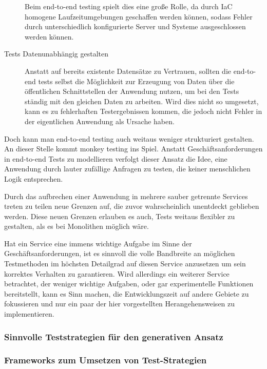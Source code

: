 \documentclass[12pt,a4paper,bibliography=totocnumbered,listof=totocnumbered]{scrartcl}
\begin{document}
\begin{description}
	Beim end-to-end testing spielt dies eine große Rolle, da durch \ac{IaC} homogene Laufzeitumgebungen geschaffen werden können, sodass Fehler durch unterschiedlich konfigurierte Server und Systeme ausgeschlossen werden können.\cite{clemson}
	
	\item[Tests Datenunabhängig gestalten] Anstatt auf bereits existente Datensätze zu Vertrauen, sollten die end-to-end tests selbst die Möglichkeit zur Erzeugung von Daten über die öffentlichen Schnittstellen der Anwendung nutzen, um bei den Tests ständig mit den gleichen Daten zu arbeiten. Wird dies nicht so umgesetzt, kann es zu fehlerhaften Testergebnissen kommen, die jedoch nicht Fehler in der eigentlichen Anwendung als Ursache haben.\cite{clemson}
\end{description}

Doch kann man end-to-end testing auch weitaus weniger strukturiert gestalten. An dieser Stelle kommt monkey testing ins Spiel. Anstatt Geschäftsanforderungen in end-to-end Tests zu modellieren verfolgt dieser Ansatz die Idee, eine Anwendung durch lauter zufällige Anfragen zu testen, die keiner menschlichen Logik entsprechen.%

Durch das aufbrechen einer Anwendung in mehrere sauber getrennte Services treten zu teilen neue Grenzen auf, die zuvor wahrscheinlich unentdeckt geblieben werden. Diese neuen Grenzen erlauben es auch, Tests weitaus flexibler zu gestalten, als es bei Monolithen möglich wäre.

Hat ein Service eine immens wichtige Aufgabe im Sinne der Geschäftsanforderungen, ist es sinnvoll die volle Bandbreite an möglichen Testmethoden im höchsten Detailgrad auf diesen Service anzusetzen um sein korrektes Verhalten zu garantieren. Wird allerdings ein weiterer Service betrachtet, der weniger wichtige Aufgaben, oder gar experimentelle Funktionen bereitstellt, kann es Sinn machen, die Entwicklungszeit auf andere Gebiete zu fokussieren und nur ein paar der hier vorgestellten Herangehensweisen zu implementieren.\cite{clemson}

\subsubsection{Sinnvolle Teststrategien für den generativen Ansatz}\label{ch:ms-gen-test}

\subsubsection{Frameworks zum Umsetzen von Test-Strategien}\label{ch:ms-test-frw}
\end{document}
